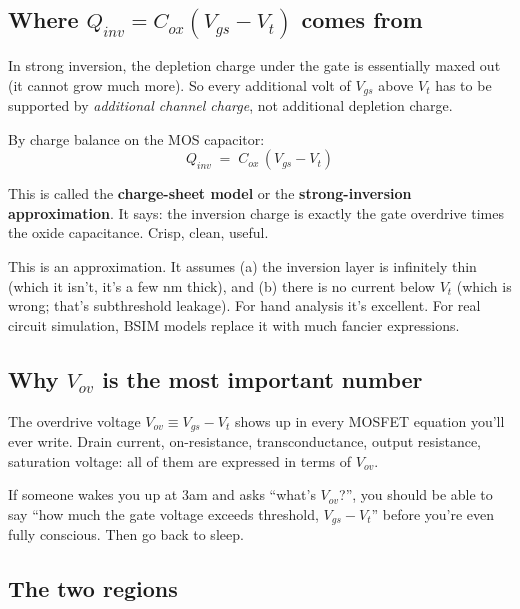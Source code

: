 \documentclass[11pt]{article}
\begin{document}
\subsection{Where $Q_{inv} = C_{ox}(V_{gs} - V_t)$ comes from}

In strong inversion, the depletion charge under the gate is essentially maxed out (it cannot grow much more). So every additional volt of $V_{gs}$ above $V_t$ has to be supported by \emph{additional channel charge}, not additional depletion charge.

By charge balance on the MOS capacitor:
\begin{equation}
\boxed{Q_{inv} \;=\; C_{ox}\,(V_{gs} - V_t)}
\end{equation}

This is called the \textbf{charge-sheet model} or the \textbf{strong-inversion approximation}. It says: the inversion charge is exactly the gate overdrive times the oxide capacitance. Crisp, clean, useful.

\begin{pitfall}
This is an approximation. It assumes (a) the inversion layer is infinitely thin (which it isn't, it's a few nm thick), and (b) there is no current below $V_t$ (which is wrong; that's subthreshold leakage). For hand analysis it's excellent. For real circuit simulation, BSIM models replace it with much fancier expressions.
\end{pitfall}

\subsection{Why $V_{ov}$ is the most important number}

The overdrive voltage $V_{ov} \equiv V_{gs} - V_t$ shows up in every MOSFET equation you'll ever write. Drain current, on-resistance, transconductance, output resistance, saturation voltage: all of them are expressed in terms of $V_{ov}$.

\begin{keyidea}
If someone wakes you up at 3am and asks ``what's $V_{ov}$?'', you should be able to say ``how much the gate voltage exceeds threshold, $V_{gs} - V_t$'' before you're even fully conscious. Then go back to sleep.
\end{keyidea}

\subsection{The two regions}
\end{document}
